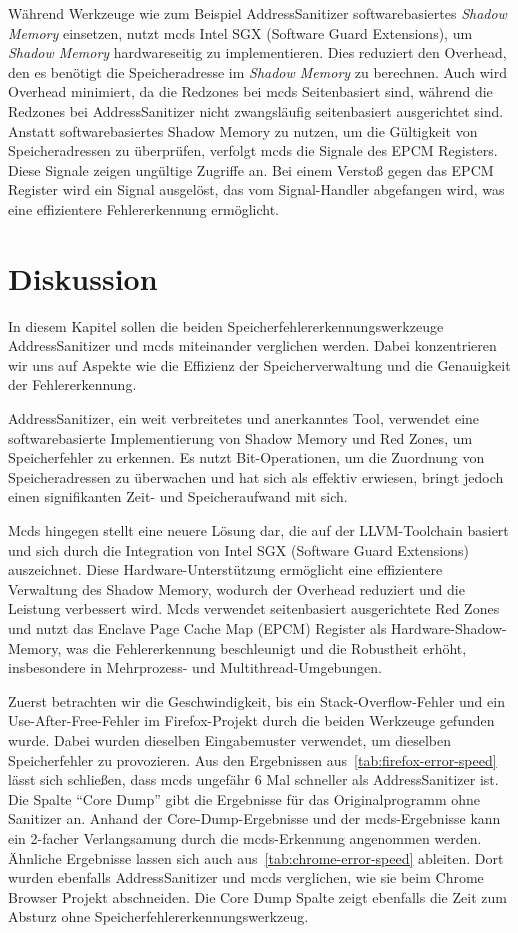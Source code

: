 \documentclass[acmtog,nonacm]{acmart}
\begin{document}
Während Werkzeuge wie zum Beispiel AddressSanitizer softwarebasiertes
\textit{Shadow Memory} einsetzen, nutzt mcds Intel SGX (Software Guard
Extensions), um \textit{Shadow Memory} hardwareseitig zu implementieren. Dies
reduziert den Overhead, den es benötigt die Speicheradresse im \textit{Shadow
  Memory} zu berechnen. Auch wird Overhead minimiert, da die Redzones bei mcds
Seitenbasiert sind, während die Redzones bei AddressSanitizer nicht
zwangsläufig seitenbasiert ausgerichtet sind. Anstatt softwarebasiertes Shadow
Memory zu nutzen, um die Gültigkeit von Speicheradressen zu überprüfen,
verfolgt mcds die Signale des EPCM Registers. Diese Signale zeigen ungültige
Zugriffe an. Bei einem Verstoß gegen das EPCM Register wird ein Signal
ausgelöst, das vom Signal-Handler abgefangen wird, was eine effizientere
Fehlererkennung ermöglicht.

\section{Diskussion}

In diesem Kapitel sollen die beiden Speicherfehlererkennungswerkzeuge
AddressSanitizer und mcds miteinander verglichen werden. Dabei konzentrieren
wir uns auf Aspekte wie die Effizienz der Speicherverwaltung und die
Genauigkeit der Fehlererkennung.

AddressSanitizer, ein weit verbreitetes und anerkanntes Tool, verwendet eine
softwarebasierte Implementierung von Shadow Memory und Red Zones, um
Speicherfehler zu erkennen. Es nutzt Bit-Operationen, um die Zuordnung von
Speicheradressen zu überwachen und hat sich als effektiv erwiesen, bringt
jedoch einen signifikanten Zeit- und Speicheraufwand mit sich.

Mcds hingegen stellt eine neuere Lösung dar, die auf der LLVM-Toolchain basiert
und sich durch die Integration von Intel SGX (Software Guard Extensions)
auszeichnet. Diese Hardware-Unterstützung ermöglicht eine effizientere
Verwaltung des Shadow Memory, wodurch der Overhead reduziert und die Leistung
verbessert wird. Mcds verwendet seitenbasiert ausgerichtete Red Zones und nutzt
das Enclave Page Cache Map (EPCM) Register als Hardware-Shadow-Memory, was die
Fehlererkennung beschleunigt und die Robustheit erhöht, insbesondere in
Mehrprozess- und Multithread-Umgebungen.

Zuerst betrachten wir die Geschwindigkeit, bis ein Stack-Overflow-Fehler und
ein Use-After-Free-Fehler im Firefox-Projekt durch die beiden Werkzeuge
gefunden wurde. Dabei wurden dieselben Eingabemuster verwendet, um dieselben
Speicherfehler zu provozieren. Aus den Ergebnissen
aus~\cref{tab:firefox-error-speed} lässt sich schließen, dass mcds ungefähr 6
Mal schneller als AddressSanitizer ist. Die Spalte "`Core Dump"' gibt die
Ergebnisse für das Originalprogramm ohne Sanitizer an. Anhand der
Core-Dump-Ergebnisse und der mcds-Ergebnisse kann ein 2-facher Verlangsamung
durch die mcds-Erkennung angenommen werden. Ähnliche Ergebnisse lassen sich
auch aus~\cref{tab:chrome-error-speed} ableiten. Dort wurden ebenfalls
AddressSanitizer und mcds verglichen, wie sie beim Chrome Browser Projekt
abschneiden. Die Core Dump Spalte zeigt ebenfalls die Zeit zum Absturz ohne
Speicherfehlererkennungswerkzeug.
\end{document}
